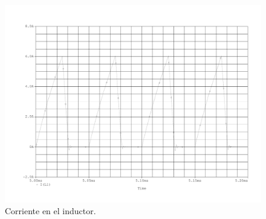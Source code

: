 \begin{figure}[H]
	\centering
	\includegraphics[scale=0.5]{Figuras/ej1_I(L1).pdf}
	\caption{Corriente en el inductor.}
	\label{fig:sim_ej1_vo}
\end{figure}

